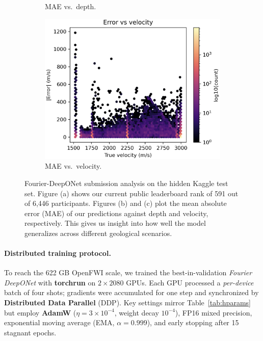 \documentclass{article}
\begin{document}
\begin{figure}[t]
\begin{subfigure}[b]{0.32\linewidth}
        \caption{MAE vs.\ depth.}
        \label{fig:fdonet_depth}
    \end{subfigure}
    \hfill
    \begin{subfigure}[b]{0.32\linewidth}
        \centering
        \includegraphics[width=\linewidth]{figures/fdonet_error_velocity.png}
        \caption{MAE vs.\ velocity.}
        \label{fig:fdonet_vel}
    \end{subfigure}
    \vspace{-4pt}
    \caption{Fourier-DeepONet submission analysis on the hidden Kaggle test set. Figure (a) shows our current public leaderboard rank of 591 out of 6,446 participants. Figures (b) and (c) plot the mean absolute error (MAE) of our predictions against depth and velocity, respectively. This gives us insight into how well the model generalizes across different geological scenarios.}
    \label{fig:kaggle_triptych}
\end{figure}

\paragraph{Distributed training protocol.} To reach the 622 GB OpenFWI scale, we trained the best-in-validation \emph{Fourier DeepONet} with \textbf{torchrun} on $2 \times 2080$ GPUs.  
Each GPU processed a \textit{per-device} batch of four shots; gradients were accumulated for one step and synchronized by \textbf{Distributed Data Parallel} (DDP).  Key settings mirror Table~\ref{tab:hparams} but employ \textbf{AdamW} ($\eta =3\times10^{-4}$, weight decay $10^{-4}$), FP16 mixed precision, exponential moving average (EMA, $\alpha=0.999$), and early stopping after 15 stagnant epochs.  
\end{document}
